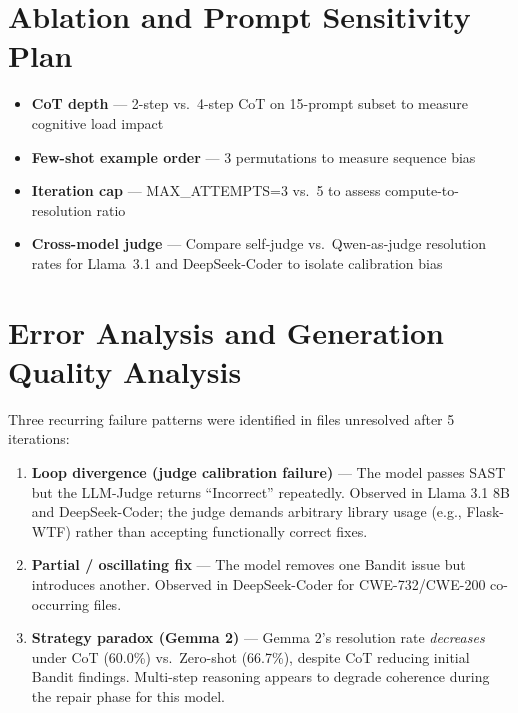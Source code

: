 \documentclass[11pt,a4paper]{article}
\begin{document}
\section{Ablation and Prompt Sensitivity Plan}

\begin{itemize}[noitemsep]
    \item \textbf{CoT depth} — 2-step vs.\ 4-step CoT on 15-prompt subset to measure cognitive load impact
    \item \textbf{Few-shot example order} — 3 permutations to measure sequence bias
    \item \textbf{Iteration cap} — MAX\_ATTEMPTS=3 vs.\ 5 to assess compute-to-resolution ratio
    \item \textbf{Cross-model judge} — Compare self-judge vs.\ Qwen-as-judge resolution rates for Llama~3.1 and DeepSeek-Coder to isolate calibration bias
\end{itemize}

\section{Error Analysis and Generation Quality Analysis}

Three recurring failure patterns were identified in files unresolved after 5 iterations:

\begin{enumerate}[noitemsep]
    \item \textbf{Loop divergence (judge calibration failure)} — The model passes SAST but the LLM-Judge returns ``Incorrect'' repeatedly. Observed in Llama 3.1 8B and DeepSeek-Coder; the judge demands arbitrary library usage (e.g., Flask-WTF) rather than accepting functionally correct fixes.
    \item \textbf{Partial / oscillating fix} — The model removes one Bandit issue but introduces another. Observed in DeepSeek-Coder for CWE-732/CWE-200 co-occurring files.
    \item \textbf{Strategy paradox (Gemma 2)} — Gemma 2's resolution rate \emph{decreases} under CoT (60.0\%) vs.\ Zero-shot (66.7\%), despite CoT reducing initial Bandit findings. Multi-step reasoning appears to degrade coherence during the repair phase for this model.
\end{enumerate}
\end{document}
